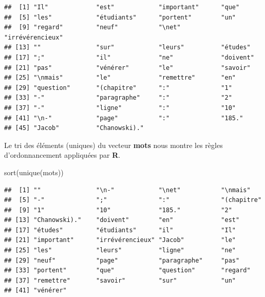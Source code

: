 \documentclass[
]{book}
\newenvironment{Shaded}{\begin{snugshade}}{\end{snugshade}}
\newcommand{\FunctionTok}[1]{\textcolor[rgb]{0.00,0.00,0.00}{#1}}
\newcommand{\NormalTok}[1]{#1}
\theoremstyle{definition}
\theoremstyle{definition}
\theoremstyle{definition}
\theoremstyle{definition}
\theoremstyle{remark}
\begin{document}
\begin{verbatim}
##  [1] "Il"             "est"            "important"      "que"           
##  [5] "les"            "étudiants"      "portent"        "un"            
##  [9] "regard"         "neuf"           "\net"           "irrévérencieux"
## [13] ""               "sur"            "leurs"          "études"        
## [17] ";"              "il"             "ne"             "doivent"       
## [21] "pas"            "vénérer"        "le"             "savoir"        
## [25] "\nmais"         "le"             "remettre"       "en"            
## [29] "question"       "(chapitre"      ":"              "1"             
## [33] "-"              "paragraphe"     ":"              "2"             
## [37] "-"              "ligne"          ":"              "10"            
## [41] "\n-"            "page"           ":"              "185."          
## [45] "Jacob"          "Chanowski)."
\end{verbatim}

Le tri des éléments (uniques) du vecteur \textbf{mots} nous montre les règles d'ordonnancement appliquées par \textbf{R}.

\begin{Shaded}
\begin{Highlighting}[]
\FunctionTok{sort}\NormalTok{(}\FunctionTok{unique}\NormalTok{(mots))}
\end{Highlighting}
\end{Shaded}

\begin{verbatim}
##  [1] ""               "\n-"            "\net"           "\nmais"        
##  [5] "-"              ";"              ":"              "(chapitre"     
##  [9] "1"              "10"             "185."           "2"             
## [13] "Chanowski)."    "doivent"        "en"             "est"           
## [17] "études"         "étudiants"      "il"             "Il"            
## [21] "important"      "irrévérencieux" "Jacob"          "le"            
## [25] "les"            "leurs"          "ligne"          "ne"            
## [29] "neuf"           "page"           "paragraphe"     "pas"           
## [33] "portent"        "que"            "question"       "regard"        
## [37] "remettre"       "savoir"         "sur"            "un"            
## [41] "vénérer"
\end{verbatim}
\end{document}
